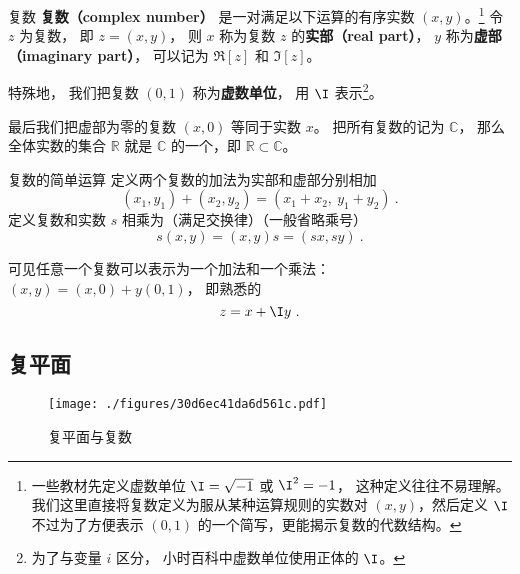 
\begin{issues}
\issueDraft
\end{issues}


\begin{definition}{复数}
\textbf{复数（complex number）} 是一对满足以下运算的有序实数 $(x,y)$。\footnote{一些教材先定义虚数单位 $\I = \sqrt{-1}$ 或 $\I^2 = -1$， 这种定义往往不易理解。 我们这里直接将复数定义为服从某种运算规则的实数对 $(x,y)$，然后定义 $\I$ 不过为了方便表示 $(0,1)$ 的一个简写，更能揭示复数的代数结构\cite{Rudin}。} 令 $z$ 为复数， 即 $z = (x, y)$， 则 $x$ 称为复数 $z$ 的\textbf{实部（real part）}， $y$ 称为\textbf{虚部（imaginary part）}， 可以记为 $\Re[z]$ 和 $\Im[z]$。

特殊地， 我们把复数 $(0, 1)$ 称为\textbf{虚数单位}， 用 $\I$ 表示\footnote{为了与变量 $i$ 区分， 小时百科中虚数单位使用正体的 $\I$。}。

最后我们把虚部为零的复数 $(x, 0)$ 等同于实数 $x$。 把所有复数的记为 $\mathbb C$， 那么全体实数的集合 $\mathbb R$ 就是 $\mathbb C$ 的一个，即 $\mathbb R \subset \mathbb C$。
\end{definition}

\begin{definition}{复数的简单运算}
定义两个复数的加法为实部和虚部分别相加
\begin{equation}\label{eq_CplxNo_1}
(x_1, y_1) + (x_2, y_2) = (x_1+ x_2,\ y_1 + y_2)~.
\end{equation}
定义复数和实数 $s$ 相乘为（满足交换律）（一般省略乘号）
\begin{equation}\label{eq_CplxNo_4}
s(x, y) = (x, y)s = (sx, sy)~.
\end{equation}
\end{definition}

可见任意一个复数可以表示为一个加法和一个乘法： $(x, y) = (x, 0) + y(0, 1)$， 即熟悉的
\begin{equation}
z = x + \I y~.
\end{equation}

\subsection{复平面}
\begin{figure}[ht]
\centering
\texttt{[image: ./figures/30d6ec41da6d561c.pdf]}
\caption{复平面与复数} \label{fig_CplxNo_1}
\end{figure}

